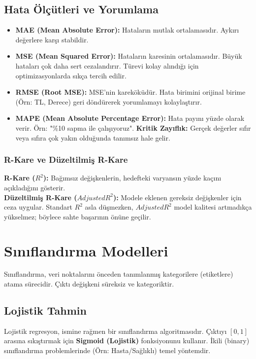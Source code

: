 \documentclass[12pt,a4paper]{article}
\begin{document}
\subsection{Hata Ölçütleri ve Yorumlama}
\begin{itemize}
    \item \textbf{MAE (Mean Absolute Error):} Hataların mutlak ortalamasıdır. Aykırı değerlere karşı stabildir.
    \item \textbf{MSE (Mean Squared Error):} Hataların karesinin ortalamasıdır. Büyük hataları çok daha sert cezalandırır. Türevi kolay alındığı için optimizasyonlarda sıkça tercih edilir.
    \item \textbf{RMSE (Root MSE):} MSE'nin kareköküdür. Hata birimini orijinal birime (Örn: TL, Derece) geri döndürerek yorumlamayı kolaylaştırır.
    \item \textbf{MAPE (Mean Absolute Percentage Error):} Hata payını yüzde olarak verir. Örn: "\%10 sapma ile çalışıyoruz". \textbf{Kritik Zayıflık:} Gerçek değerler sıfır veya sıfıra çok yakın olduğunda tanımsız hale gelir.
\end{itemize}

\subsubsection{R-Kare ve Düzeltilmiş R-Kare}
\textbf{R-Kare ($R^2$):} Bağımsız değişkenlerin, hedefteki varyansın yüzde kaçını açıkladığını gösterir.
\\ \textbf{Düzeltilmiş R-Kare ($Adjusted R^2$):} Modele eklenen gereksiz değişkenler için ceza uygular. Standart $R^2$ asla düşmezken, $Adjusted R^2$ model kalitesi artmadıkça yükselmez; böylece sahte başarının önüne geçilir.



\newpage
\section{Sınıflandırma Modelleri}
Sınıflandırma, veri noktalarını önceden tanımlanmış kategorilere (etiketlere) atama sürecidir. Çıktı değişkeni süreksiz ve kategoriktir.

\subsection{Lojistik Tahmin}
Lojistik regresyon, ismine rağmen bir sınıflandırma algoritmasıdır. Çıktıyı $[0, 1]$ arasına sıkıştırmak için \textbf{Sigmoid (Lojistik)} fonksiyonunu kullanır. İkili (binary) sınıflandırma problemlerinde (Örn: Hasta/Sağlıklı) temel yöntemdir.
\end{document}
